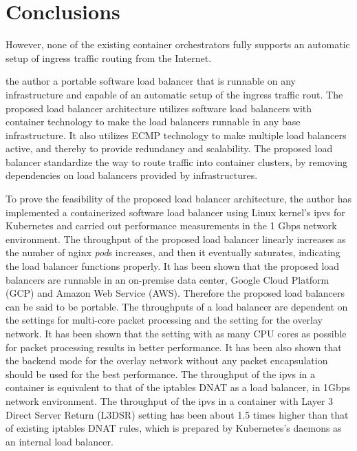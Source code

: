 \section{Conclusions}\label{Conclusions}

However, none of the existing container orchestrators fully supports an automatic setup of ingress traffic routing from the Internet.

 the author a portable software load balancer that is runnable on any infrastructure and capable of an automatic setup of the ingress traffic rout.
The proposed load balancer architecture utilizes software load balancers with container technology to make the load balancers runnable in any base infrastructure.
It also utilizes ECMP technology to make multiple load balancers active, and thereby to provide redundancy and scalability.
The proposed load balancer standardize the way to route traffic into container clusters, by removing dependencies on load balancers provided by infrastructures.

To prove the feasibility of the proposed load balancer architecture, the author has implemented a containerized software load balancer using Linux kernel's ipvs for Kubernetes and carried out performance measurements in the 1 Gbps network environment.
%
The throughput of the proposed load balancer linearly increases as the number of nginx {\em pod}s increases, and then it eventually saturates, indicating the load balancer functions properly.
It has been shown that the proposed load balancers are runnable in an on-premise data center, Google Cloud Platform (GCP) and Amazon Web Service (AWS).
Therefore the proposed load balancers can be said to be portable.
%
The throughputs of a load balancer are dependent on the settings for multi-core packet processing and the setting for the overlay network.
It has been shown that the setting with as many CPU cores as possible for packet processing results in better performance.
It has been also shown that the backend mode for the overlay network without any packet encapsulation should be used for the best performance.
%
The throughput of the ipvs in a container is equivalent to that of the iptables DNAT as a load balancer, in 1Gbps network environment.
The throughput of the ipvs in a container with Layer 3 Direct Server Return (L3DSR) setting has been about 1.5 times higher than that of existing iptables DNAT rules, which is prepared by Kubernetes's daemons as an internal load balancer.

